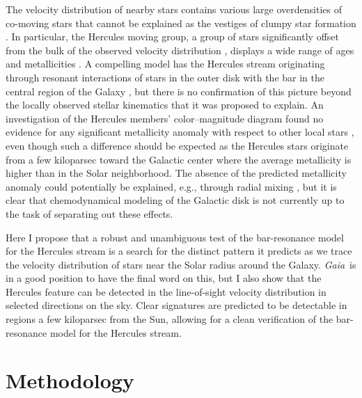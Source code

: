 \documentclass[12pt,preprint]{aastex}
\newcommand{\eg}{e.g.}
\newcommand{\Gaia}{\emph{Gaia}}
\begin{document}
The velocity distribution of nearby stars contains various large
overdensities of co-moving stars that cannot be explained as the
vestiges of clumpy star formation \citep[\eg,][]{Bovy10a}. In
particular, the Hercules moving group, a group of stars significantly
offset from the bulk of the observed velocity distribution
\citep[\eg,][see \figurename~\ref{fig:obs}]{Dehnen98b,Bovy09a},
displays a wide range of ages and metallicities
\citep{Blaauw70a,raboud98a,caloi99a,Bensby07a,Bovy10a}. A compelling
model has the Hercules stream originating through resonant
interactions of stars in the outer disk with the bar in the central
region of the Galaxy \citep{dehnen00a,fux01a}, but there is no
confirmation of this picture beyond the locally observed stellar
kinematics that it was proposed to explain. An investigation of the
Hercules members' color--magnitude diagram found no evidence for any
significant metallicity anomaly with respect to other local stars
\citep{Bovy10a}, even though such a difference should be expected as
the Hercules stars originate from a few kiloparsec toward the Galactic
center where the average metallicity is higher than in the Solar
neighborhood. The absence of the predicted metallicity anomaly could
potentially be explained, \eg, through radial mixing
\citep{sellwood02a}, but it is clear that chemodynamical modeling of
the Galactic disk is not currently up to the task of separating out
these effects.

Here I propose that a robust and unambiguous test of the bar-resonance
model for the Hercules stream is a search for the distinct pattern it
predicts as we trace the velocity distribution of stars near the Solar
radius around the Galaxy. \Gaia\ is in a good position to have the
final word on this, but I also show that the Hercules feature can be
detected in the line-of-sight velocity distribution in selected
directions on the sky. Clear signatures are predicted to be detectable
in regions a few kiloparsec from the Sun, allowing for a clean
verification of the bar-resonance model for the Hercules stream.


\section{Methodology}\label{sec:method}
\end{document}
